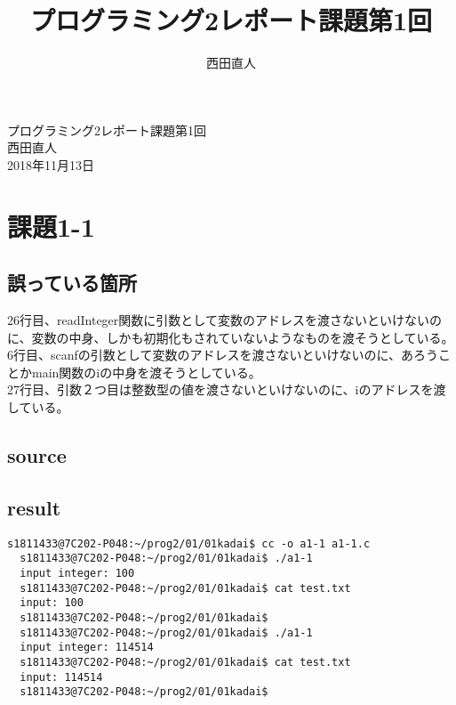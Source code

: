 \documentclass[10pt,a4paper]{jsarticle}
\title{プログラミング2レポート課題第1回}
\author{西田直人}
\begin{document}
\begin{center}
{\LARGE プログラミング2レポート課題第1回} \\
\large
西田直人 \\ 2018年11月13日
\end{center}
\normalsize
\section{課題1-1}
\subsection{誤っている箇所}
26行目、readInteger関数に引数として変数のアドレスを渡さないといけないのに、変数の中身、しかも初期化もされていないようなものを渡そうとしている。\\
6行目、scanfの引数として変数のアドレスを渡さないといけないのに、あろうことかmain関数のiの中身を渡そうとしている。\\
27行目、引数２つ目は整数型の値を渡さないといけないのに、iのアドレスを渡している。\\

\subsection{source}


\subsection{result}

\begin{lstlisting}[basicstyle=\ttfamily\footnotesize,frame=single]
  s1811433@7C202-P048:~/prog2/01/01kadai$ cc -o a1-1 a1-1.c
  s1811433@7C202-P048:~/prog2/01/01kadai$ ./a1-1
  input integer: 100
  s1811433@7C202-P048:~/prog2/01/01kadai$ cat test.txt
  input: 100
  s1811433@7C202-P048:~/prog2/01/01kadai$
  s1811433@7C202-P048:~/prog2/01/01kadai$ ./a1-1
  input integer: 114514
  s1811433@7C202-P048:~/prog2/01/01kadai$ cat test.txt
  input: 114514
  s1811433@7C202-P048:~/prog2/01/01kadai$
   
\end{lstlisting}
\end{document}
